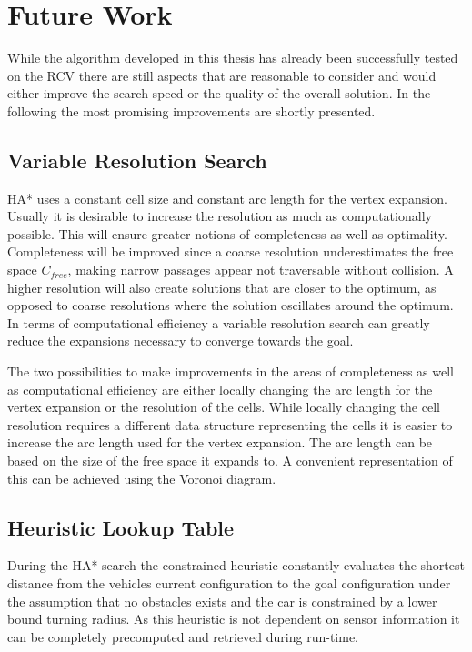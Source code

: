 \chapter{Future Work}
While the algorithm developed in this thesis has already been successfully tested on the RCV there are still aspects that are reasonable to consider and would either improve the search speed or the quality of the overall solution. In the following the most promising improvements are shortly presented.

\section{Variable Resolution Search}
HA* uses a constant cell size and constant arc length for the vertex expansion. Usually it is desirable to increase the resolution as much as computationally possible. This will ensure greater notions of completeness as well as optimality. Completeness will be improved since a coarse resolution underestimates the free space $C_{free}$, making narrow passages appear not traversable without collision. A higher resolution will also create solutions that are closer to the optimum, as opposed to coarse resolutions where the solution oscillates around the optimum. In terms of computational efficiency a variable resolution search can greatly reduce the expansions necessary to converge towards the goal.

The two possibilities to make improvements in the areas of completeness as well as computational efficiency are either locally changing the arc length for the vertex expansion or the resolution of the cells. While locally changing the cell resolution requires a different data structure representing the cells it is easier to increase the arc length used for the vertex expansion. The arc length can be based on the size of the free space it expands to. A convenient representation of this can be achieved using the Voronoi diagram. 

\section{Heuristic Lookup Table}
During the HA* search the constrained heuristic constantly evaluates the shortest distance from the vehicles current configuration to the goal configuration under the assumption that no obstacles exists and the car is constrained by a lower bound turning radius. As this heuristic is not dependent on sensor information it can be completely precomputed and retrieved during run-time.
	
